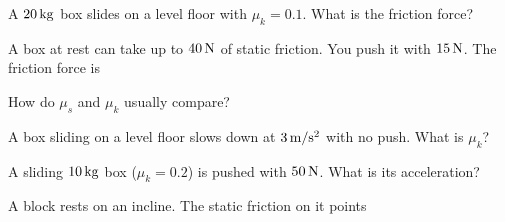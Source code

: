\begin{exo}{}
A $20\,\mathrm{kg}$ box slides on a level floor with $\mu_k=0.1$. What is the friction force?
\choices{$2\N$}{$20\N$}{$200\N$}{$0.1\N$}
\end{exo}
\begin{exo}{}
A box at rest can take up to $40\,\mathrm{N}$ of static friction. You push it with $15\,\mathrm{N}$. The friction force is
\end{exo}
\begin{exo}{}
How do $\mu_s$ and $\mu_k$ usually compare?
\end{exo}
\begin{exo}{}
A box sliding on a level floor slows down at $3\mss$ with no push. What is $\mu_k$?
\end{exo}
\begin{exo}{}
A sliding $10\,\mathrm{kg}$ box ($\mu_k=0.2$) is pushed with $50\,\mathrm{N}$. What is its acceleration?
\choices{$5\mss$}{$3\mss$}{$7\mss$}{$2\mss$}
\end{exo}
\begin{exo}{}
A block rests on an incline. The static friction on it points
\end{exo}

